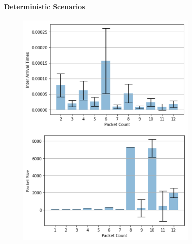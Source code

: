\documentclass[msc,deptreport, cs]{infthesis} %
\begin{document}
\paragraph*{Deterministic Scenarios} 
\vspace{-5mm}

\begin{figure}[H]
    \centering
    \begin{minipage}{0.5\textwidth}
        \centering
        \includegraphics[width=0.8\textwidth]{test.png} %
        \caption{}
        \label{fig:size1}
    \end{minipage}\hfill
    \begin{minipage}{0.5\textwidth}
        \centering

\end{minipage}
\end{figure}
\end{document}
